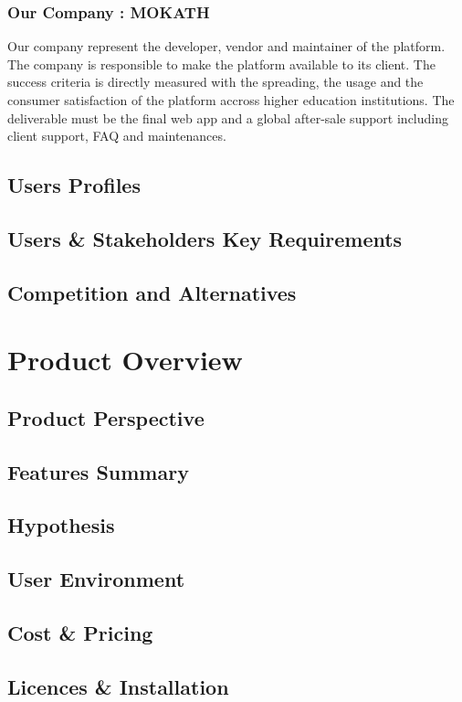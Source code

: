 \documentclass[12pt,a4paper,oneside, titlepage]{article}
\begin{document}
	    \subsubsection{Our Company : MOKATH}
	    Our company represent the developer, vendor and maintainer of the platform. The company is responsible to make the 
	    platform available to its client. The success criteria is directly measured with the spreading, the usage and the 
	    consumer satisfaction of the platform accross higher education institutions. The deliverable must be the final web
	    app and a global after-sale support including client support, FAQ and maintenances.
	    
	\subsection{Users Profiles}
	\subsection{Users \& Stakeholders Key Requirements}
	\subsection{Competition and Alternatives}
	
    \newpage
	\section{Product Overview}
	\subsection{Product Perspective}
	\subsection{Features Summary}
	\subsection{Hypothesis}
	\subsection{User Environment}
	\subsection{Cost \& Pricing}
	\subsection{Licences \& Installation}
	
\end{document}
